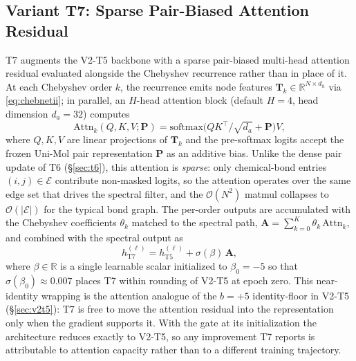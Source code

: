
\subsection{Variant T7: Sparse Pair-Biased Attention Residual}
\label{sec:t7}
T7 augments the V2-T5 backbone with a sparse pair-biased multi-head
attention residual evaluated alongside the Chebyshev recurrence rather than
in place of it. At each Chebyshev order $k$, the recurrence emits node
features $\mathbf{T}_k\in\mathbb{R}^{N\times d_h}$ via
\eqref{eq:chebnetii}; in parallel, an $H$-head attention block (default
$H{=}4$, head dimension $d_a{=}32$) computes
\begin{equation}
    \mathrm{Attn}_k(Q,K,V;\mathbf{P}) = \mathrm{softmax}\!\bigl(QK^\top/\sqrt{d_a} + \mathbf{P}\bigr) V,
    \label{eq:t7attn}
\end{equation}
where $Q,K,V$ are linear projections of $\mathbf{T}_k$ and the pre-softmax
logits accept the frozen Uni-Mol pair representation $\mathbf{P}$ as an
additive bias. Unlike the dense pair update of T6 (\S\ref{sec:t6}), this
attention is \emph{sparse}: only chemical-bond entries
$(i,j)\in\mathcal{E}$ contribute non-masked logits, so the attention
operates over the same edge set that drives the spectral filter, and the
$\mathcal{O}(N^2)$ matmul collapses to $\mathcal{O}(|\mathcal{E}|)$ for the
typical bond graph. The per-order outputs are accumulated with the
Chebyshev coefficients $\theta_k$ matched to the spectral path,
$\mathbf{A}{=}\sum_{k=0}^{K}\theta_k\,\mathrm{Attn}_k$, and combined with
the spectral output as
\begin{equation}
    h^{(\ell)}_{\mathrm{T7}} = h^{(\ell)}_{\mathrm{T5}} + \sigma(\beta)\,\mathbf{A},
    \label{eq:t7gate}
\end{equation}
where $\beta\in\mathbb{R}$ is a single learnable scalar initialized to
$\beta_{0}{=}{-}5$ so that $\sigma(\beta_0)\approx 0.007$ places T7 within
rounding of V2-T5 at epoch zero. This near-identity wrapping is the
attention analogue of the $b{=}{+}5$ identity-floor in V2-T5
(\S\ref{sec:v2t5}): T7 is free to move the attention residual into the
representation only when the gradient supports it. With the gate at its
initialization the architecture reduces exactly to V2-T5, so any
improvement T7 reports is attributable to attention capacity rather than to
a different training trajectory.


